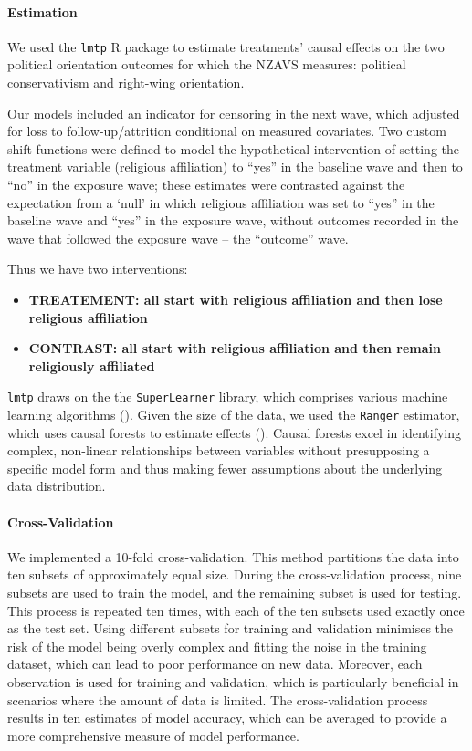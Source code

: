 \documentclass[
  singlecolumn]{article}
\let\oldparagraph\paragraph
\renewcommand{\paragraph}[1]{\oldparagraph{#1}\mbox{}}
\begin{document}
\paragraph{Estimation}\label{estimation}

We used the \texttt{lmtp} R package to estimate treatments' causal
effects on the two political orientation outcomes for which the NZAVS
measures: political conservativism and right-wing orientation.

Our models included an indicator for censoring in the next wave, which
adjusted for loss to follow-up/attrition conditional on measured
covariates. Two custom shift functions were defined to model the
hypothetical intervention of setting the treatment variable (religious
affiliation) to ``yes'' in the baseline wave and then to ``no'' in the
exposure wave; these estimates were contrasted against the expectation
from a `null' in which religious affiliation was set to ``yes'' in the
baseline wave and ``yes'' in the exposure wave, without outcomes
recorded in the wave that followed the exposure wave -- the ``outcome''
wave.

Thus we have two interventions:

\begin{itemize}
\item
  \textbf{TREATEMENT: all start with religious affiliation and then lose
  religious affiliation}
\item
  \textbf{CONTRAST: all start with religious affiliation and then remain
  religiously affiliated}
\end{itemize}

\texttt{lmtp} draws on the the \texttt{SuperLearner} library, which
comprises various machine learning algorithms
(). Given the
size of the data, we used the \texttt{Ranger} estimator, which uses
causal forests to estimate effects (). Causal forests excel in identifying complex, non-linear
relationships between variables without presupposing a specific model
form and thus making fewer assumptions about the underlying data
distribution.

\paragraph{Cross-Validation}\label{cross-validation}

We implemented a 10-fold cross-validation. This method partitions the
data into ten subsets of approximately equal size. During the
cross-validation process, nine subsets are used to train the model, and
the remaining subset is used for testing. This process is repeated ten
times, with each of the ten subsets used exactly once as the test set.
Using different subsets for training and validation minimises the risk
of the model being overly complex and fitting the noise in the training
dataset, which can lead to poor performance on new data. Moreover, each
observation is used for training and validation, which is particularly
beneficial in scenarios where the amount of data is limited. The
cross-validation process results in ten estimates of model accuracy,
which can be averaged to provide a more comprehensive measure of model
performance.
\end{document}
